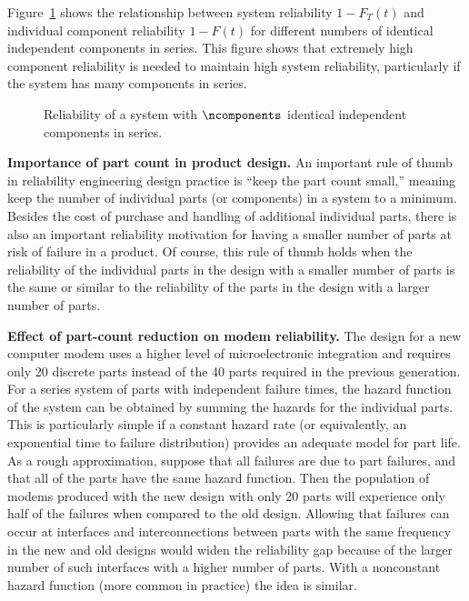Figure~\ref{figure:series.effect.ps} shows the relationship between
system reliability $1-F_{T}(t)$ and individual component reliability
$1-F(t)$ for different
numbers of identical independent components in series.  This figure
shows that extremely high component reliability is needed to maintain
high system reliability, particularly if the system has many
components in series.
\begin{figure}
\caption{Reliability of a system with $\ncomponents$ identical
independent components in series.}
\label{figure:series.effect.ps}
\end{figure}

{\bf Importance of part count in product design.} An important rule
of thumb in reliability engineering design practice is ``keep the
part count small,'' meaning keep the number of individual parts (or
components) in a system to a minimum. Besides the cost of purchase
and handling of additional individual parts, there is also an
important reliability motivation for having a smaller number of
parts at risk of failure in a product. Of course, this rule of thumb
holds when the reliability of the individual parts in the design
with a smaller number of parts is the same or similar to the
reliability of the parts in the design with a larger number of
parts.

\begin{example}
{\bf Effect of part-count reduction on modem reliability.}
The design for a new computer modem uses a higher level of
microelectronic integration and requires only 20 discrete parts
instead of the 40 parts required in the previous generation.  
For a series system of parts with independent failure times, the hazard
function of the system can be obtained by summing the hazards for
the individual parts.  This is particularly simple if 
a constant hazard rate (or equivalently, an exponential time to
failure distribution) provides an adequate model for part life.  As a
rough approximation, suppose that all failures are due to part
failures, and that all of the parts have the same hazard function.
Then the population of modems produced with the new design with only 20
parts will experience only half of the failures when compared to the
old design. Allowing that failures can occur at interfaces and
interconnections between parts with the same frequency in the new and
old designs would widen the reliability gap because of the larger
number of such interfaces with a higher number of parts.  With a
nonconstant hazard function (more common in practice) the idea is
similar.
\end{example}

